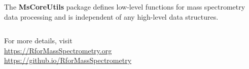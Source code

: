\documentclass[final]{beamer}
\newcommand{\bpkg}[1]{{\textbf{#1}}}
\newcommand{\secintro}[1]{
  \bigskip
  \begin{tcolorbox}[notitle,boxrule=10pt,colback=blue!10,colframe=blue!10]{#1}\end{tcolorbox}}
\begin{document}
\begin{frame}[fragile]
\begin{columns}[T]
\begin{column}{.35\textwidth}
      \vspace{1cm}

      \begin{block}{}
        \justifying The \bpkg{MsCoreUtils} package defines low-level
        functions for mass spectrometry data processing and is
        independent of any high-level data structures.
      \end{block}


    \end{column}

  \end{columns}








  \vspace{2cm}

  \secintro{

    \begin{block}{}
      \begin{center}
        {\Large For more details, visit \\
          \vspace{2mm}
          \url{https://RforMassSpectrometry.org} \\
          \vspace{10mm}
          \url{https://github.io/RforMassSpectrometry}
        }
      \end{center}

    \end{block}
  }

  \vfill


\end{frame}
\end{document}
